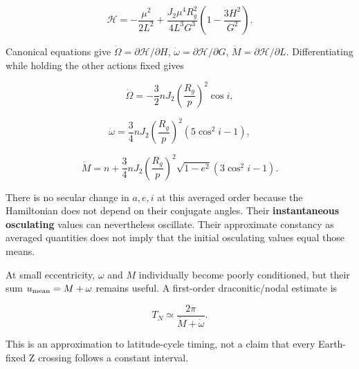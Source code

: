 \documentclass[10pt,a4paper]{article}
\numberwithin{equation}{section}
\begin{document}
\begin{equation}\mathcal H=-\frac{\mu^2}{2L^2}
+\frac{J_2\mu^4R_g^2}{4L^3G^3}
\left(1-\frac{3H^2}{G^2}\right).\label{eq:ch3-10}\end{equation}

\begin{sloppypar}Canonical equations give \(\dot\Omega=\partial\mathcal H/\partial H\), \(\dot\omega=\partial\mathcal H/\partial G\), \(\dot M=\partial\mathcal H/\partial L\). Differentiating while holding the other actions fixed gives\end{sloppypar}


\begin{equation}\boxed{\dot\Omega=-\frac32nJ_2\left(\frac{R_g}{p}\right)^2\cos i},\label{eq:secular-node}\end{equation}

\begin{equation}\boxed{\dot\omega=\frac34nJ_2\left(\frac{R_g}{p}\right)^2(5\cos^2i-1)},\label{eq:ch3-12}\end{equation}

\begin{equation}\boxed{\dot M=n+\frac34nJ_2\left(\frac{R_g}{p}\right)^2
\sqrt{1-e^2}(3\cos^2i-1)}.\label{eq:ch3-13}\end{equation}

\begin{sloppypar}There is no secular change in \(a,e,i\) at this averaged order because the Hamiltonian does not depend on their conjugate angles. Their \textbf{instantaneous osculating} values can nevertheless oscillate. Their approximate constancy as averaged quantities does not imply that the initial osculating values equal those means.\end{sloppypar}


\begin{sloppypar}At small eccentricity, \(\omega\) and \(M\) individually become poorly conditioned, but their sum \(u_{\rm mean}=M+\omega\) remains useful. A first-order draconitic/nodal estimate is\end{sloppypar}


\begin{equation}T_N\simeq\frac{2\pi}{\dot M+\dot\omega}.\label{eq:ch3-14}\end{equation}

\begin{sloppypar}This is an approximation to latitude-cycle timing, not a claim that every Earth-fixed Z crossing follows a constant interval.\end{sloppypar}
\end{document}

